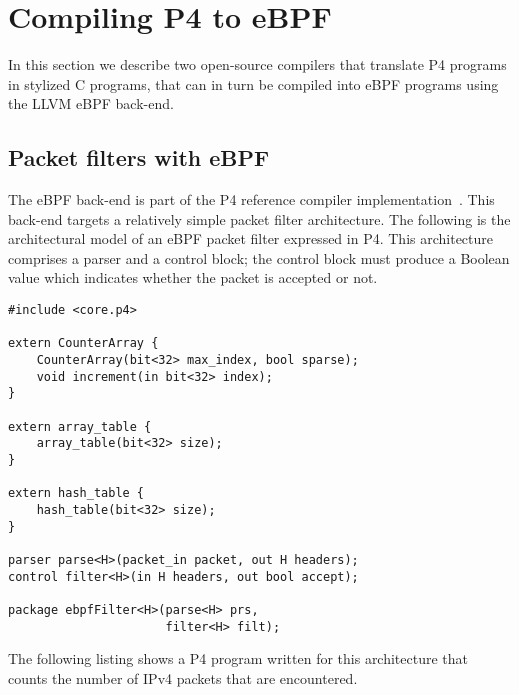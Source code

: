 \section{Compiling P4 to eBPF}\label{sec:compilation}

In this section we describe two open-source compilers that translate
P4 programs in stylized C programs, that can in turn be compiled into
eBPF programs using the LLVM eBPF back-end.

\subsection{Packet filters with eBPF}\label{sec:ebpf}

The eBPF back-end is part of the P4 reference compiler
implementation~\cite{p4-ebpf-backend}.  This back-end targets a
relatively simple packet filter architecture.  The following is the
architectural model of an eBPF packet filter expressed in P4.  This
architecture comprises a parser and a control block; the control block
must produce a Boolean value which indicates whether the packet is
accepted or not.

\begin{lstlisting}
#include <core.p4>

extern CounterArray {
    CounterArray(bit<32> max_index, bool sparse);
    void increment(in bit<32> index);
}

extern array_table {
    array_table(bit<32> size);
}

extern hash_table {
    hash_table(bit<32> size);
}

parser parse<H>(packet_in packet, out H headers);
control filter<H>(in H headers, out bool accept);

package ebpfFilter<H>(parse<H> prs,
                      filter<H> filt);
\end{lstlisting}

The following listing shows a P4 program written for this architecture
that counts the number of IPv4 packets that are encountered.

